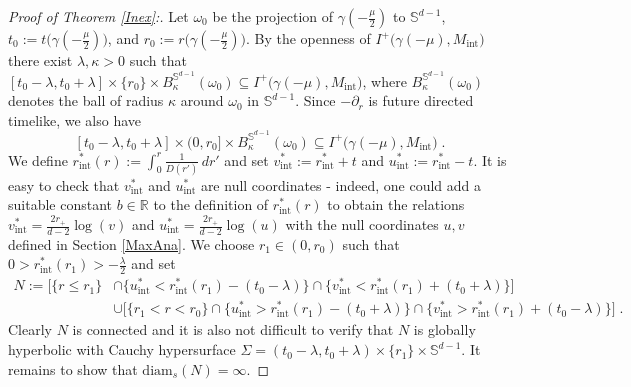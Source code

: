 \documentclass[reqno]{article}
\newcommand{\R}{\mathbb{R}}
\newcommand{\diam}{\mathrm{diam}}
\newcommand{\Sd}{\mathbb{S}^{d-1}}
\newcommand{\Mint}{M_{\mathrm{int}}}
\begin{document}
\begin{proof}[Proof of Theorem \ref{Inex}:]
Let $\omega_0$ be the projection of $\gamma(-\frac{\mu}{2})$ to $\Sd$, $t_0 := t\big(\gamma(-\frac{\mu}{2})\big)$, and $r_0 := r\big(\gamma(-\frac{\mu}{2})\big)$. By the openness of $I^+\big(\gamma(-\mu), \Mint\big)$ there exist $\lambda, \kappa >0$ such that $[t_0 - \lambda, t_0 + \lambda] \times \{r_0\} \times B^{\Sd}_\kappa(\omega_0) \subseteq I^+\big(\gamma(-\mu), \Mint\big)$, where $B^{\Sd}_\kappa(\omega_0)$ denotes the ball of radius $\kappa$ around $\omega_0$ in $\Sd$.  Since $-\partial_r$ is future directed timelike, we also have
\begin{equation}
\label{BlockContained}
[t_0 - \lambda, t_0 + \lambda] \times (0,r_0] \times B^{\Sd}_\kappa(\omega_0)  \subseteq I^+\big(\gamma(-\mu), \Mint\big) \;.
\end{equation}
We define $r^*_\mathrm{int}(r) := \int_0 ^r \frac{1}{D(r')} \, dr'$ and set $v^*_\mathrm{int} := r^*_\mathrm{int} + t$ and $u^*_\mathrm{int} := r^*_\mathrm{int} - t$. It is easy to check that $v^*_\mathrm{int}$ and $u^*_\mathrm{int}$ are null coordinates - indeed, one could add a suitable constant $b \in \R$ to the definition of $r^*_\mathrm{int}(r)$ to obtain the relations $v^*_\mathrm{int} = \frac{2r_+}{d-2} \log (v)$ and $u^*_\mathrm{int} = \frac{2r_+}{d-2} \log(u)$ with the null coordinates $u,v$ defined in Section \ref{MaxAna}. We choose $r_1 \in (0,r_0)$ such that $0>r^*_\mathrm{int}(r_1) > -\frac{\lambda}{2}$ and set
\begin{equation*}
\begin{split}
N:=\Big[\{r \leq r_1\} &\cap  \{u^*_\mathrm{int} < r^*_\mathrm{int}(r_1) - (t_0 - \lambda)\} \cap \{v^*_\mathrm{int} < r^*_\mathrm{int}(r_1) +(t_0 + \lambda)\}\Big] \\
&\cup \Big[ \{r_1 < r < r_0\} \cap \{u^*_\mathrm{int} > r^*_\mathrm{int}(r_1) - (t_0 + \lambda)\} \cap \{v^*_\mathrm{int} > r^*_\mathrm{int}(r_1) +(t_0 - \lambda)\}\Big] \;.
\end{split}
\end{equation*}
Clearly $N$ is connected and it is also not difficult to verify that $N$ is globally hyperbolic with Cauchy hypersurface $\Sigma = (t_0 - \lambda, t_0 + \lambda) \times \{r_1\} \times \Sd$. It remains to show that $\diam_s(N) = \infty$.


\end{proof}
\end{document}
